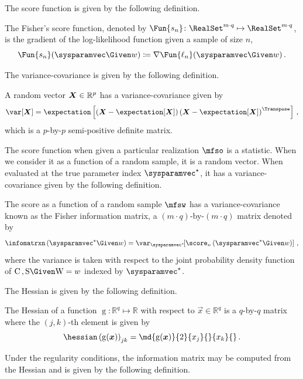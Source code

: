 \documentclass[../main.tex]{subfiles}
\begin{document}
The score function is given by the following definition.
\begin{definition}
The Fisher's score function, denoted by $\Fun{s_n} \colon \RealSet^{m \cdot q} \mapsto \RealSet^{m \cdot q}$, is the gradient of the log-likelihood function given a sample of size $n$,
\begin{equation}
\label{eq:score}
    \Fun{s_n}(\sysparamvec \Given w) \coloneqq \nabla \Fun{\ell_n}(\sysparamvec \Given w)\,.
\end{equation}
\end{definition}

The variance-covariance is given by the following definition.
\begin{definition}
A random vector $\mathrm{\boldsymbol{X}} \in \mathbb{R}^{p}$ has a variance-covariance given by
\begin{equation}
\label{eq:covariance_matrix_op}
    \var\!\left[\RV{\vec{X}}\right] = \expectation
    \left [
        \left(\RV{\vec{X}} - \expectation[\RV{\vec{X}}] \right)
        \left(\RV{\vec{X}} - \expectation[\RV{\vec{X}}] \right)^\Transpose
    \right ]\,,
\end{equation}
which is a $p$-by-$p$ semi-positive definite matrix.
\end{definition}

The score function when given a particular realization $\mfso$ is a statistic. When we consider it as a function of a random sample, it is a random vector. When evaluated at the true parameter index $\tparam\sysparamvec$, it has a variance-covariance given by the following definition.
\begin{definition}
\label{def:info_matrix_var}
The score as a function of a random sample $\mfsw$ has a variance-covariance known as the Fisher information matrix, a $(m \cdot q)$-by-$(m \cdot q)$ matrix denoted by
\begin{equation}
\label{eq:info_matrix_var}
    \infomatrxn\left(\tparam\sysparamvec \Given w \right)
        = \operatorname{\var_{\tparam\sysparamvec}}\!\!\left[\score_n\left(\tparam\sysparamvec \Given w\right)\right]\,,
\end{equation}
where the variance is taken with respect to the joint probability density function of $\rvcand\,, \sv \Given \RV{W} = w$ indexed by $\tparam\sysparamvec$.
\end{definition}
The Hessian is given by the following definition.
\begin{definition}
The Hessian of a function $\operatorname{g} \colon \mathbb{R}^q \mapsto \mathbb{R}$ with respect to $\vec{x} \in \mathbb{R}^q$ is a $q$-by-$q$ matrix where the $(j,k)$-th element is given by
\begin{equation}
    \hessian \left(\operatorname{g}(\vec{x})\right)_{j k} =
        \md{\operatorname{g}(\vec{x})}{2}{x_j}{}{x_k}{}\,.
\end{equation}
\end{definition}
Under the regularity conditions, the information matrix may be computed from the Hessian and is given by the following definition.
\end{document}

